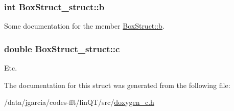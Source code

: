 \subsubsection[{\texorpdfstring{b}{b}}]{\setlength{\rightskip}{0pt plus 5cm}int Box\+Struct\+\_\+struct\+::b}\hypertarget{structBoxStruct__struct_aee44748dc579c5d794853ee8b133d197}{}\label{structBoxStruct__struct_aee44748dc579c5d794853ee8b133d197}
Some documentation for the member \hyperlink{structBoxStruct__struct_aee44748dc579c5d794853ee8b133d197}{Box\+Struct\+::b}. 
\subsubsection[{\texorpdfstring{c}{c}}]{\setlength{\rightskip}{0pt plus 5cm}double Box\+Struct\+\_\+struct\+::c}\hypertarget{structBoxStruct__struct_a4543370ed67b2cf5ae3f55201bea11e6}{}\label{structBoxStruct__struct_a4543370ed67b2cf5ae3f55201bea11e6}
Etc. 

The documentation for this struct was generated from the following file\+:\begin{DoxyCompactItemize}
\item 
/data/jgarcia/codes-\/fft/lin\+Q\+T/src/\hyperlink{doxygen__c_8h}{doxygen\+\_\+c.\+h}\end{DoxyCompactItemize}

